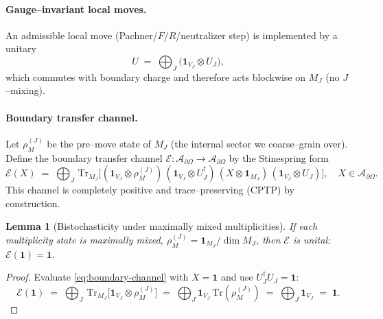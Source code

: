 \documentclass[11pt]{article}
\theoremstyle{plain}
\newtheorem{lemma}[theorem]{Lemma}
\theoremstyle{definition}
\begin{document}
\paragraph{Gauge–invariant local moves.}
An admissible local move (Pachner/$F$/$R$/neutralizer step) is implemented by a unitary
\begin{equation}\label{eq:block-unitary}
  U \;=\; \bigoplus_{J}\big(\mathbf{1}_{V_J}\otimes U_J\big),
\end{equation}
which commutes with boundary charge and therefore acts blockwise on $M_J$ (no $J$–mixing).

\paragraph{Boundary transfer channel.}
Let $\rho^{(J)}_M$ be the pre–move state of $M_J$ (the internal sector we coarse–grain over).
Define the boundary transfer channel $\mathcal{E}:\mathcal{A}_{\partial\Omega}\to\mathcal{A}_{\partial\Omega}$ by the Stinespring form
\begin{equation}\label{eq:boundary-channel}
  \mathcal{E}(X)\;=\;
  \bigoplus_J\, \mathrm{Tr}_{M_J}\!\Big[
    (\mathbf{1}_{V_J}\otimes \rho^{(J)}_M)\,
    (\mathbf{1}_{V_J}\otimes U_J^\dagger)\,
    (X\otimes \mathbf{1}_{M_J})\,
    (\mathbf{1}_{V_J}\otimes U_J)
  \Big],\quad X\in\mathcal{A}_{\partial\Omega}.
\end{equation}
This channel is completely positive and trace–preserving (CPTP) by construction.

\begin{lemma}[Bistochasticity under maximally mixed multiplicities]\label{lem:bistochastic}
  If each multiplicity state is maximally mixed,
  $\rho^{(J)}_M=\mathbf{1}_{M_J}/\dim M_J$,
  then $\mathcal{E}$ is unital: $\mathcal{E}(\mathbf{1})=\mathbf{1}$.
\end{lemma}

\begin{proof}
  Evaluate \eqref{eq:boundary-channel} with $X=\mathbf{1}$ and use $U_J^\dagger U_J=\mathbf{1}$:
  \[
    \mathcal{E}(\mathbf{1}) \;=\; \bigoplus_J\, \mathrm{Tr}_{M_J}\!\big[\mathbf{1}_{V_J}\otimes \rho^{(J)}_M\big]
    \;=\; \bigoplus_J \mathbf{1}_{V_J}\,\mathrm{Tr}(\rho^{(J)}_M)
    \;=\; \bigoplus_J \mathbf{1}_{V_J}
    \;=\; \mathbf{1}.
  \]
\end{proof}
\end{document}
